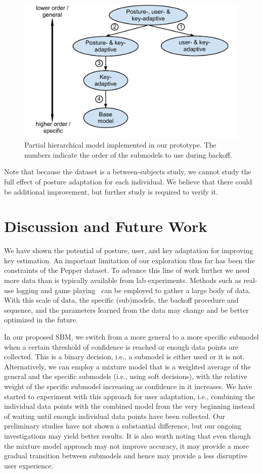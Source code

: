 \documentclass{sigchi}
\begin{document}
\begin{figure}
  \centering
  \includegraphics[width=0.9\columnwidth]{figures/partial-hierarchy.pdf}
  \caption{Partial hierarchical model implemented in our prototype. The numbers indicate the order of the 
submodels to use during backoff.}
  \label{fig:partial-hierarchy}
\end{figure}
Note that because the dataset is a between-subjects study, we cannot study
the full effect of posture adaptation for each individual. We believe that there could be additional improvement, but further study is required to verify it.

\section{Discussion and Future Work}
We have shown the potential of posture, user, and key adaptation for 
improving key estimation. An important limitation of our exploration thus far has been
the constraints of the Pepper dataset. To advance this line of work further we
need more data than is typically available from lab experiments. Methods such as real-use logging and game 
playing~\cite{Rudchenko:2011} can be employed to gather a large body of
data. With this scale of data, the specific (sub)models, the
backoff procedure and sequence, and the parameters learned from the 
data may change and be better optimized in the future.

In our proposed SBM, we switch from a more general to a more specific submodel
when a certain threshold of confidence is reached or enough data points are
collected. This is a binary decision, i.e., a submodel is either used or it is not.
Alternatively,
we can employ a mixture model that is a weighted average of
the general and the specific submodels (i.e., using soft decisions), with the
relative weight of the specific submodel increasing as confidence in it increases. We have started to experiment with this approach for user adaptation,
i.e., combining the individual data points with the combined model from the very beginning instead
of waiting until enough individual data points have been collected. Our preliminary studies have not shown a substantial difference, but our ongoing investigations may yield better results.
It is also worth noting that even though the mixture model approach may not
improve accuracy, it may provide a more gradual transition between submodels
and hence may provide a less disruptive user experience. 
\end{document}
